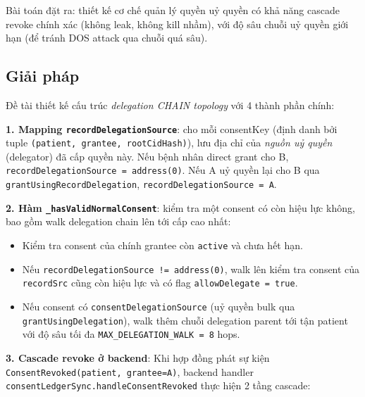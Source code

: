 \documentclass[../DoAn]{subfiles}
\begin{document}
Bài toán đặt ra: thiết kế cơ chế quản lý quyền uỷ quyền có khả năng cascade revoke chính xác (không leak, không kill nhầm), với độ sâu chuỗi uỷ quyền giới hạn (để tránh DOS attack qua chuỗi quá sâu).

\subsection{Giải pháp}

Đề tài thiết kế cấu trúc \textit{delegation CHAIN topology} với 4 thành phần chính:

\textbf{1. Mapping \texttt{recordDelegationSource}}: cho mỗi consentKey (định danh bởi tuple \texttt{(patient, grantee, rootCidHash)}), lưu địa chỉ của \textit{nguồn uỷ quyền} (delegator) đã cấp quyền này. Nếu bệnh nhân direct grant cho B, \texttt{recordDelegationSource = address(0)}. Nếu A uỷ quyền lại cho B qua \texttt{grantUsingRecordDelegation}, \texttt{recordDelegationSource = A}.

\textbf{2. Hàm \texttt{\_hasValidNormalConsent}}: kiểm tra một consent có còn hiệu lực không, bao gồm walk delegation chain lên tới cấp cao nhất:

\begin{itemize}
    \item Kiểm tra consent của chính grantee còn \texttt{active} và chưa hết hạn.
    \item Nếu \texttt{recordDelegationSource != address(0)}, walk lên kiểm tra consent của \texttt{recordSrc} cũng còn hiệu lực và có flag \texttt{allowDelegate = true}.
    \item Nếu consent có \texttt{consentDelegationSource} (uỷ quyền bulk qua \texttt{grantUsingDelegation}), walk thêm chuỗi delegation parent tới tận patient với độ sâu tối đa \texttt{MAX\_DELEGATION\_WALK = 8} hops.
\end{itemize}

\textbf{3. Cascade revoke ở backend}: Khi hợp đồng phát sự kiện \texttt{ConsentRevoked(patient, grantee=A)}, backend handler \texttt{consentLedgerSync.handleConsentRevoked} thực hiện 2 tầng cascade:
\end{document}

